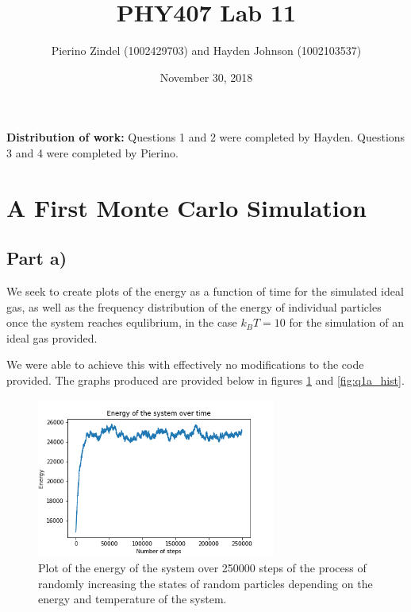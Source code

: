\documentclass{article}
\title{PHY407 Lab 11}
\author{Pierino Zindel (1002429703) and Hayden Johnson (1002103537)}
\date{November 30, 2018}
\begin{document}
\maketitle

\noindent \textbf{Distribution of work:} Questions 1 and 2 were completed by Hayden. Questions 3 and 4 were completed by Pierino.

\section{A First Monte Carlo Simulation}

\subsection{Part a)}

We seek to create plots of the energy as a function of time for the simulated ideal gas, as well as the frequency distribution of the energy of individual particles once the system reaches equlibrium, in the case $k_BT=10$ for the simulation of an ideal gas provided.

We were able to achieve this with effectively no modifications to the code provided. The graphs produced are provided below in figures \ref{fig:q1a_energy} and \ref{fig:q1a_hist}.

\begin{figure}[H]
	\centering
	\includegraphics[width=0.7\textwidth]{../images/q1a_energy.png}
	\caption{Plot of the energy of the system over 250000 steps of the process of randomly increasing the states of random particles depending on the energy and temperature of the system.}
	\label{fig:q1a_energy}
\end{figure}
\end{document}
